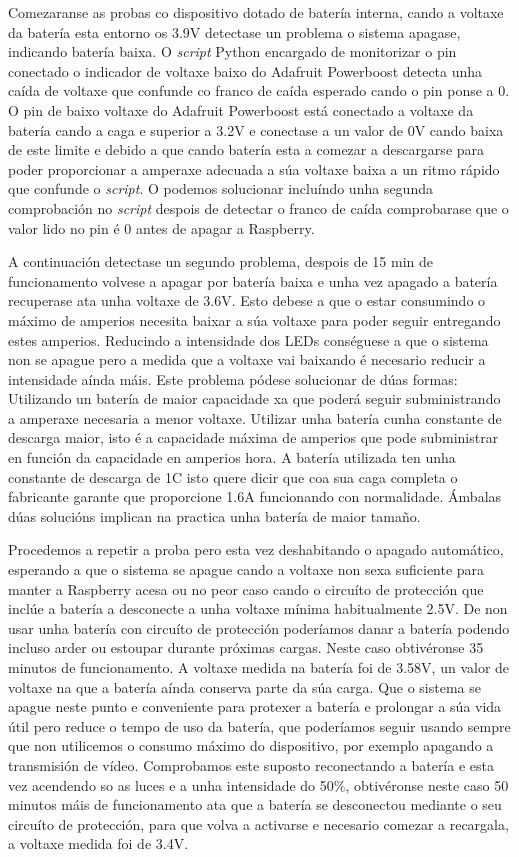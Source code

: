 Comezaranse as probas co dispositivo dotado de batería interna, cando a voltaxe da batería esta entorno os 3.9V detectase un problema o sistema apagase, indicando batería baixa. O \emph{script} Python encargado de monitorizar o pin conectado o indicador de voltaxe baixo do Adafruit Powerboost detecta unha caída de voltaxe que confunde co franco de caída esperado cando o pin ponse a 0. O pin de baixo voltaxe do Adafruit Powerboost está conectado a voltaxe da batería cando a caga e superior a 3.2V e conectase a un valor de 0V cando baixa de este limite e debido a que cando batería esta a comezar a descargarse para poder proporcionar a amperaxe adecuada a súa voltaxe baixa a un ritmo rápido que confunde o \emph{script}. O podemos solucionar incluíndo unha segunda comprobación no \emph{script} despois de detectar o franco de caída comprobarase que o valor lido no pin é 0 antes de apagar a Raspberry.

A continuación detectase un segundo problema, despois de 15 min de funcionamento volvese a apagar por batería baixa e unha vez apagado a batería recuperase ata unha voltaxe de 3.6V. Esto debese a que o estar consumindo o máximo de amperios necesita baixar a súa voltaxe para poder seguir entregando estes amperios. Reducindo a intensidade dos LEDs conséguese a que o sistema non se apague pero a medida que a voltaxe vai baixando é necesario reducir a intensidade aínda máis.  Este problema pódese solucionar de dúas formas:
Utilizando un batería de maior capacidade xa que poderá seguir subministrando a amperaxe necesaria a menor voltaxe.
Utilizar unha batería cunha constante de descarga maior, isto é a capacidade máxima de amperios que pode subministrar en función da capacidade en amperios hora. A batería utilizada ten unha constante de descarga de 1C isto quere dicir que coa sua caga completa o fabricante garante que proporcione 1.6A funcionando con normalidade.
Ámbalas dúas solucións implican na practica unha batería de maior tamaño.

Procedemos a repetir a proba pero esta vez deshabitando o apagado automático, esperando a que o sistema se apague cando a voltaxe non sexa suficiente para manter a Raspberry acesa ou no peor caso cando o circuíto de protección que inclúe a batería a desconecte a unha voltaxe mínima habitualmente 2.5V. De non usar unha batería con circuíto de protección poderíamos danar a batería podendo incluso arder ou estoupar durante próximas cargas. Neste caso obtivéronse 35 minutos de funcionamento. A voltaxe medida na batería foi de 3.58V, un valor de voltaxe na que a batería aínda conserva parte da súa carga. Que o sistema se apague neste punto e conveniente para protexer a batería e prolongar a súa vida útil pero reduce o tempo de uso da batería, que poderíamos seguir usando sempre que non utilicemos o consumo máximo do dispositivo, por exemplo apagando a transmisión de vídeo. Comprobamos este suposto reconectando a batería e esta vez acendendo so as luces e a unha intensidade do 50\(\%\), obtivéronse neste caso 50 minutos máis de funcionamento ata que a batería se desconectou mediante o seu circuíto de protección, para que volva a activarse e necesario comezar a recargala, a voltaxe medida foi de 3.4V.



